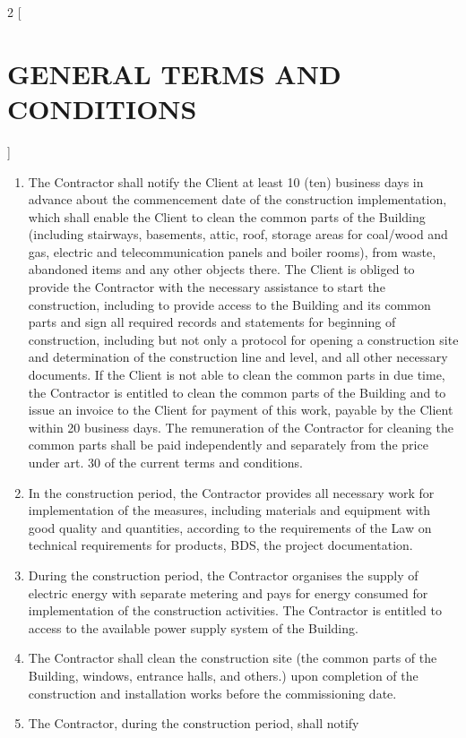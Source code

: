 \begin{multicols}{2} [\section{GENERAL TERMS AND CONDITIONS}]
\begin{enumerate}
    installation works within the prescribed period of
    construction. The Contractor shall notify the Client about the
    estimated commencement date of the construction implementation
    within 20 (twenty) business days after the signing of this
    contract.
  \item The Contractor shall notify the Client at least 10 (ten)
    business days in advance about the commencement date of the
    construction implementation, which shall enable the Client to
    clean the common parts of the Building (including stairways,
    basements, attic, roof, storage areas for coal/wood and gas,
    electric and telecommunication panels and boiler rooms), from
    waste, abandoned items and any other objects there. The Client is
    obliged to provide the Contractor with the necessary assistance to
    start the construction, including to provide access to the
    Building and its common parts and sign all required records and
    statements for beginning of construction, including but not only a
    protocol for opening a construction site and determination of the
    construction line and level, and all other necessary documents. If
    the Client is not able to clean the common parts in due time, the
    Contractor is entitled to clean the common parts of the Building
    and to issue an invoice to the Client for payment of this work,
    payable by the Client within 20 business days. The remuneration of
    the Contractor for cleaning the common parts shall be paid
    independently and separately from the price under art. 30 of the
    current terms and conditions.
  \item In the construction period, the Contractor provides all
    necessary work for implementation of the measures, including
    materials and equipment with good quality and quantities,
    according to the requirements of the Law on technical requirements
    for products, BDS, the project documentation.
  \item During the construction period, the Contractor organises the
    supply of electric energy with separate metering and pays for
    energy consumed for implementation of the construction
    activities. The Contractor is entitled to access to the available
    power supply system of the Building.
  \item The Contractor shall clean the construction site (the common
    parts of the Building, windows, entrance halls, and others.) upon
    completion of the construction and installation works before the
    commissioning date.
  \item The Contractor, during the construction period, shall notify

\end{enumerate}
\end{multicols}
